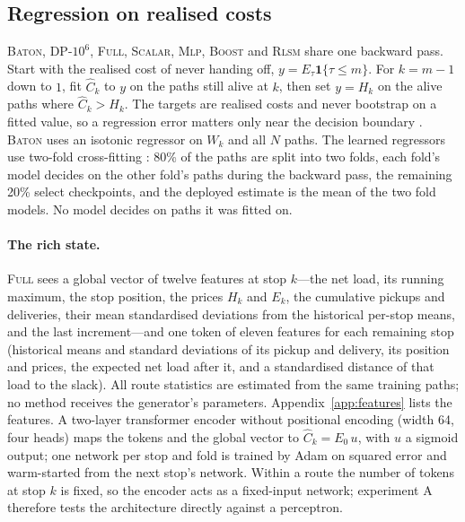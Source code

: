 \documentclass[trsc,dblanonrev]{informs4}
\newcommand{\Full}{\textsc{Full}}
\newcommand{\Scalar}{\textsc{Scalar}}
\newcommand{\Mlp}{\textsc{Mlp}}
\newcommand{\Boost}{\textsc{Boost}}
\newcommand{\Baton}{\textsc{Baton}}
\newcommand{\Rlsm}{\textsc{Rlsm}}
\begin{document}
\subsection{Regression on realised costs}

\Baton{}, DP-$10^6$, \Full{}, \Scalar{}, \Mlp{}, \Boost{} and \Rlsm{} share one
backward pass. Start with the realised cost of never handing off,
$y = E_\tau \mathbf{1}\{\tau \le m\}$. For $k = m-1$ down to $1$, fit
$\hat C_k$ to $y$ on the paths still alive at $k$, then set $y = H_k$ on the
alive paths where $\hat C_k > H_k$. The targets are realised costs and never
bootstrap on a fitted value, so a regression error matters only near the
decision boundary \citep{longstaff2001valuing, tsitsiklis2001regression}.
\Baton{} uses an isotonic regressor on $W_k$ and all $N$ paths. The learned
regressors use two-fold cross-fitting \citep{chernozhukov2018double}: 80\% of
the paths are split into two folds, each fold's model decides on the other
fold's paths during the backward pass, the remaining 20\% select checkpoints,
and the deployed estimate is the mean of the two fold models. No model decides
on paths it was fitted on.

\paragraph{The rich state.} \Full{} sees a global vector of twelve features at
stop $k$---the net load, its running maximum, the stop position, the prices
$H_k$ and $E_k$, the cumulative pickups and deliveries, their mean standardised
deviations from the historical per-stop means, and the last increment---and
one token of eleven features for each remaining stop (historical means and
standard deviations of its pickup and delivery, its position and prices, the
expected net load after it, and a standardised distance of that load to the
slack). All route statistics are estimated from the same training paths; no
method receives the generator's parameters. Appendix~\ref{app:features} lists
the features. A two-layer transformer encoder without positional encoding
(width 64, four heads) maps the tokens and the global vector to
$\hat C_k = E_0\,u$, with $u$ a sigmoid output; one network per stop and fold
is trained by Adam on squared error and warm-started from the next stop's
network. Within a route the number of tokens at stop $k$ is fixed, so the
encoder acts as a fixed-input network; experiment A therefore tests the
architecture directly against a perceptron.
\end{document}
